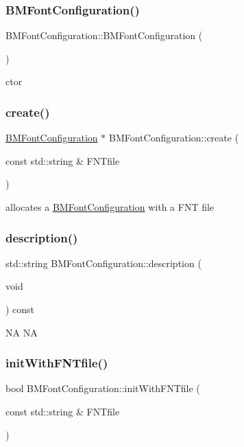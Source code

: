 \subsubsection{\texorpdfstring{B\+M\+Font\+Configuration()}{BMFontConfiguration()}}
{\footnotesize\ttfamily B\+M\+Font\+Configuration\+::\+B\+M\+Font\+Configuration (\begin{DoxyParamCaption}{ }\end{DoxyParamCaption})}

ctor \mbox{\label{group__label_gaf6f6e33acf57e6fdf10de805002f21c6}} 
\subsubsection{\texorpdfstring{create()}{create()}}
{\footnotesize\ttfamily \hyperlink{classBMFontConfiguration}{B\+M\+Font\+Configuration} $\ast$ B\+M\+Font\+Configuration\+::create (\begin{DoxyParamCaption}\item[{const std\+::string \&}]{F\+N\+Tfile }\end{DoxyParamCaption})\hspace{0.3cm}{\ttfamily [static]}}

allocates a \hyperlink{classBMFontConfiguration}{B\+M\+Font\+Configuration} with a F\+NT file \mbox{\label{group__label_gab5b833ca803bff72c9ab19abf55eb8ac}} 
\subsubsection{\texorpdfstring{description()}{description()}}
{\footnotesize\ttfamily std\+::string B\+M\+Font\+Configuration\+::description (\begin{DoxyParamCaption}\item[{void}]{ }\end{DoxyParamCaption}) const}

NA  NA \mbox{\label{group__label_ga0eb7f4ea5cc521e1502006c04cc67733}} 
\subsubsection{\texorpdfstring{init\+With\+F\+N\+Tfile()}{initWithFNTfile()}}
{\footnotesize\ttfamily bool B\+M\+Font\+Configuration\+::init\+With\+F\+N\+Tfile (\begin{DoxyParamCaption}\item[{const std\+::string \&}]{F\+N\+Tfile }\end{DoxyParamCaption})}

